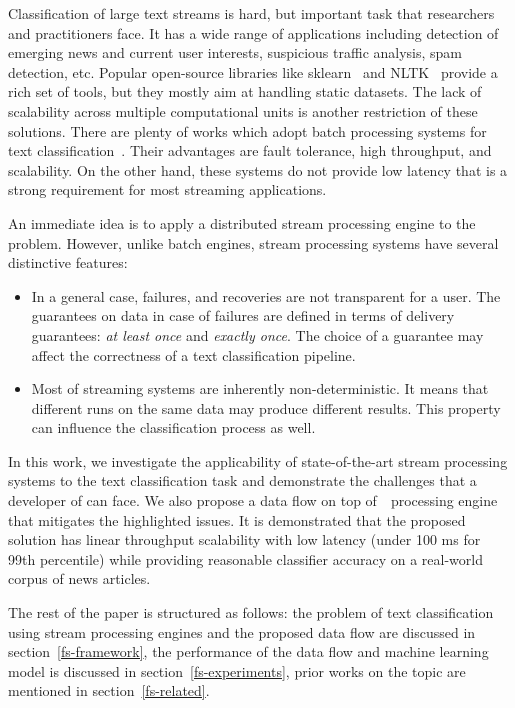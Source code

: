 \label {fs-short-intro}

Classification of large text streams is hard, but important task that researchers and practitioners face. It has a wide range of applications including detection of emerging news and current user interests, suspicious traffic analysis, spam detection, etc. Popular open-source libraries like sklearn~\cite{sklearn_api} and NLTK~\cite{bird2009natural} provide a rich set of tools, but they mostly aim at handling static datasets. The lack of scalability across multiple computational units is another restriction of these solutions. There are plenty of works which adopt batch processing systems for text classification~\cite{semberecki2016distributed, svyatkovskiy2016large, baltas2016apache, Nodarakis2016LargeSS}. Their advantages are fault tolerance, high throughput, and scalability. On the other hand, these systems do not provide low latency that is a strong requirement for most streaming applications.

An immediate idea is to apply a distributed stream processing engine to the problem. However, unlike batch engines, stream processing systems have several distinctive features: 

\begin{itemize}
    \item In a general case, failures, and recoveries are not transparent for a user. The guarantees on data in case of failures are defined in terms of delivery guarantees: {\em at least once} and {\em exactly once}. The choice of a guarantee may affect the correctness of a text classification pipeline.
    \item Most of streaming systems are inherently non-deterministic. It means that different runs on the same data may produce different results. This property can influence the classification process as well.
\end{itemize}

In this work, we investigate the applicability of state-of-the-art stream processing systems to the text classification task and demonstrate the challenges that a developer of can face. We also propose a data flow on top of~\FlameStream\ processing engine~\cite{we2018beyondmr, we2018adbis} that mitigates the highlighted issues. It is demonstrated that the proposed solution has linear throughput scalability with low latency (under 100 ms for 99th percentile) while providing reasonable classifier accuracy on a real-world corpus of news articles.

The rest of the paper is structured as follows: the problem of text classification using stream processing engines and the proposed data flow are discussed in section~\ref{fs-framework}, the performance of the data flow and machine learning model is discussed in section~\ref{fs-experiments}, prior works on the topic are mentioned in section~\ref{fs-related}.
